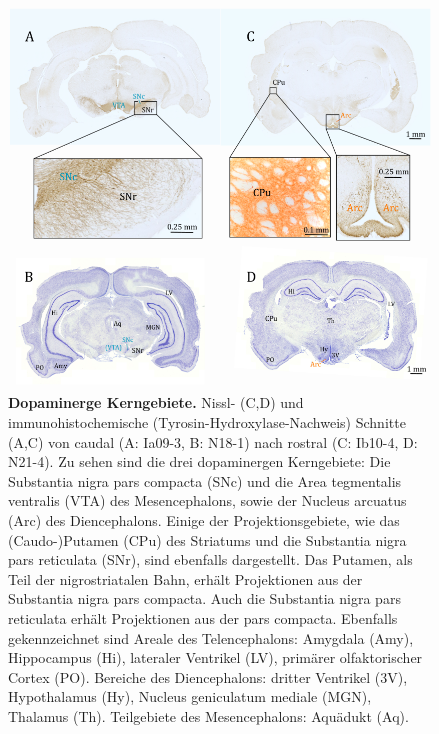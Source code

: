 \begin{figure}[H]
    \centering
    \includegraphics[width=\textwidth]{pictures/Bilder_monoamine_systeme/dopaminerge_kerne.png}
    \caption[Dopaminerge Kerngebiete]{\textbf{Dopaminerge Kerngebiete.} Nissl- (C,D) und immunohistochemische (Tyrosin-Hydroxylase-Nachweis) Schnitte (A,C) von caudal (A: Ia09-3, B: N18-1) nach rostral (C: Ib10-4, D: N21-4). Zu sehen sind die drei dopaminergen Kerngebiete: Die Substantia nigra pars compacta (SNc) und die Area tegmentalis ventralis (VTA) des Mesencephalons, sowie der Nucleus arcuatus (Arc) des Diencephalons. Einige der Projektionsgebiete, wie das (Caudo-)Putamen (CPu) des Striatums und die Substantia nigra pars reticulata (SNr), sind ebenfalls dargestellt. Das Putamen, als Teil der nigrostriatalen Bahn, erhält Projektionen aus der Substantia nigra pars compacta. Auch die Substantia nigra pars reticulata erhält Projektionen aus der pars compacta. Ebenfalls gekennzeichnet sind Areale des Telencephalons: Amygdala (Amy), Hippocampus (Hi), lateraler Ventrikel (LV), primärer olfaktorischer Cortex (PO). Bereiche des Diencephalons: dritter Ventrikel (3V), Hypothalamus (Hy), Nucleus geniculatum mediale (MGN), Thalamus (Th). Teilgebiete des Mesencephalons: Aquädukt (Aq).}
    \label{fig:dopaminerge_kerngebiete}
\end{figure}

